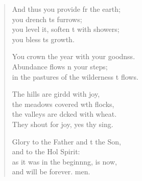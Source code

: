 \begin{verse}
\begin{patverse}
And thus you provide fr the earth;\Med\\
you drench \pointup{\i}ts furrows;\\
you level it, soften \pointup{\i}t with showers;\Med\\
you bless \pointup{\i}ts growth.

You crown the year with your goodnss.\Flex\\
Abundance flows \pointup{\i}n your steps;\Med\\
in the pastures of the wilderness \pointup{\i}t flows.

The hills are girdd with joy,\Med\\
the meadows covered w\pointup{\i}th flocks,\\
the valleys are dcked with wheat.\Med\\
They shout for joy, yes thy sing.

Glory to the Father and t the Son,\Med\\
and to the Hol Spirit:\\
as it was in the beginn\pointup{\i}ng, is now,\Med\\
and will be forever. men. 
  \end{patverse}
\end{verse}
